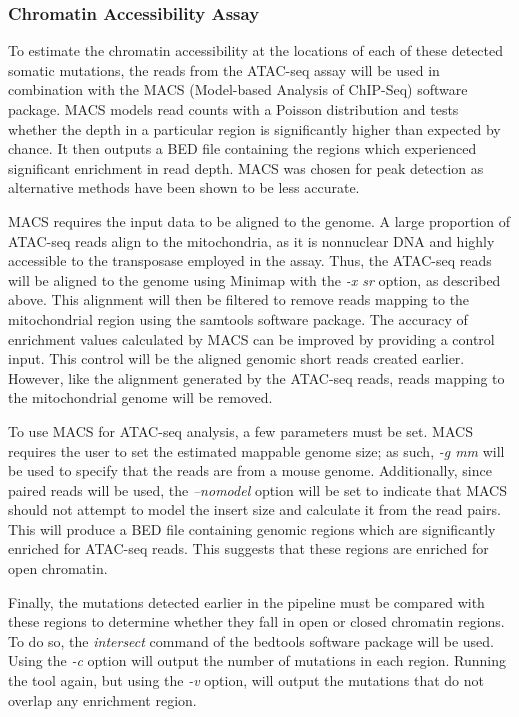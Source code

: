 \subsubsection{Chromatin Accessibility Assay}
To estimate the chromatin accessibility at the locations of each of these detected somatic mutations, the reads from the ATAC-seq assay will be used in combination with the MACS (Model-based Analysis of ChIP-Seq) software package. MACS models read counts with a Poisson distribution and tests whether the depth in a particular region is significantly higher than expected by chance. It then outputs a BED file containing the regions which experienced significant enrichment in read depth. MACS was chosen for peak detection as alternative methods have been shown to be less accurate.

MACS requires the input data to be aligned to the genome. A large proportion of ATAC-seq reads align to the mitochondria, as it is nonnuclear DNA and highly accessible to the transposase employed in the assay. Thus, the ATAC-seq reads will be aligned to the genome using Minimap with the \textit{-x sr} option, as described above. This alignment will then be filtered to remove reads mapping to the mitochondrial region using the samtools software package. The accuracy of enrichment values calculated by MACS can be improved by providing a control input. This control will be the aligned genomic short reads created earlier. However, like the alignment generated by the ATAC-seq reads, reads mapping to the mitochondrial genome will be removed.

To use MACS for ATAC-seq analysis, a few parameters must be set.
MACS requires the user to set the estimated mappable genome size; as such, \textit{-g mm} will be used to specify that the reads are from a mouse genome. Additionally, since paired reads will be used, the \textit{--nomodel} option will be set to indicate that MACS should not attempt to model the insert size and calculate it from the read pairs. This will produce a BED file containing genomic regions which are significantly enriched for ATAC-seq reads. This suggests that these regions are enriched for open chromatin.

Finally, the mutations detected earlier in the pipeline must be compared with these regions to determine whether they fall in open or closed chromatin regions. To do so, the \textit{intersect} command of the bedtools software package will be used. Using the \textit{-c} option will output the number of mutations in each region. Running the tool again, but using the \textit{-v} option, will output the mutations that do not overlap any enrichment region.

